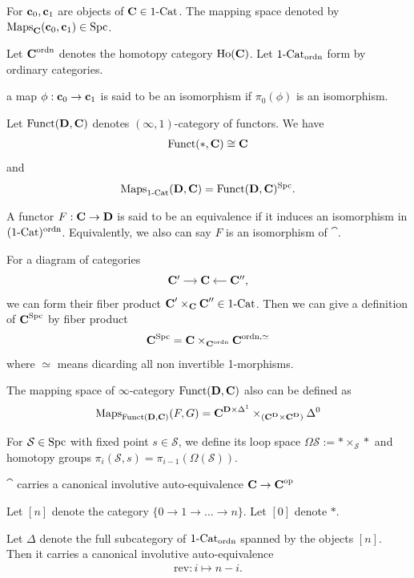 {\np For $\textbf{c}_0,\textbf{c}_1$ are objects of $\textbf{C}\in\text{1-Cat}$. The mapping space denoted by $\operatorname{Maps}_{\textbf{C}}(\textbf{c}_0,\textbf{c}_1)\in\text{Spc}$.

\np Let $\textbf{C}^{\text{ordn}}$ denotes the homotopy category $\text{Ho}(\textbf{C})$. Let $\text{1-Cat}_{\text{ordn}}$  form by ordinary categories.

\np a map $\phi:\textbf{c}_0\to \textbf{c}_1$ is said to be an isomorphism if $\pi_0(\phi)$ is an isomorphism.


\np Let $\operatorname{Funct}(\textbf{D},\textbf{C})$ denotes $(\infty,1)$-category of functors. We have 
\begin{align*}
    \operatorname{Funct}(*,\textbf{C})\cong \textbf{C}
\end{align*}
and 
\begin{align*}
    \operatorname{Maps}_{\text{1-Cat}}(\textbf{D},\textbf{C}) = \operatorname{Funct}(\textbf{D},\textbf{C})^{\text{Spc}}.
\end{align*}



\np A functor $F:\textbf{C}\to\textbf{D}$ is said to be an equivalence if it induces an isomorphism in $(\text{1-Cat})^{\text{ordn}}$.
Equivalently, we also can say $F$ is an isomorphism of $\cat$.

\np For a diagram of categories 
\[
\begin{tikzcd}[cramped, sep=small]
\mathbf{C}' \arrow[r] & \mathbf{C} & \mathbf{C}'' \arrow[l]
\end{tikzcd},
\]
we can form their fiber product $\textbf{C}'\times_{\textbf{C}}\textbf{C}''\in\text{1-Cat}$. Then we can give a definition of $\textbf{C}^{\text{Spc}}$ by fiber product 
\begin{align*}
    \textbf{C}^{\text{Spc}} =\textbf{C} \times_{\textbf{C}^{\text{ordn}}} \textbf{C}^{\text{ordn},\simeq} 
\end{align*}
where $\simeq$ means dicarding all non invertible 1-morphisms. 

\np The mapping space of $\infty$-category $\operatorname{Funct}(\textbf{D},\textbf{C})$ also can be defined as 
\begin{align*}
    \text{Maps}_{\text{Funct}(\textbf{D}, \textbf{C})}(F, G) = \textbf{C}^{\textbf{D}\times \Delta^1}\times_{(\textbf{C}^{\textbf{D}}\times\textbf{C}^{\textbf{D}})} \Delta^0
\end{align*}

\np For $\mathcal{S}\in\text{Spc}$ with fixed point $s\in\mathcal{S}$, we define its loop space $\Omega\mathcal{S}:=*\times_{\mathcal{S}}*$ and homotopy groups $\pi_i(\mathcal{S},s)=\pi_{i-1}({\Omega(\mathcal{S})})$.

\np $\cat$ carries a canonical involutive auto-equivalence $\textbf{C}\to \textbf{C}^{\text{op}}$

\np Let $[n]$ denote the category $\{0 \to 1 \to \dots \to n\}$. Let $[0]$ denote $*$.

\np Let $\Delta$ denote the full subcategory of $\text{1-Cat}_{\text{ordn}}$ spanned by the objects $[n]$. Then it carries a canonical involutive auto-equivalence
\begin{align*}
    \text{rev}:i\mapsto n-i.
\end{align*}

}
